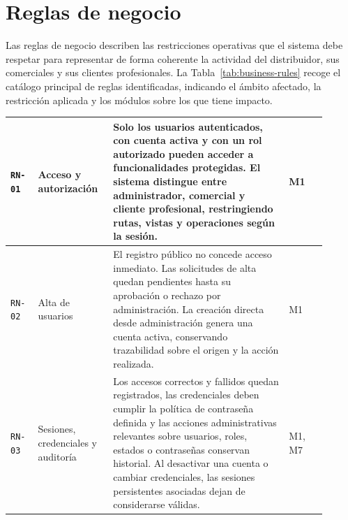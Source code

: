 \section{Reglas de negocio}
\label{sec:BusinessRules}

Las reglas de negocio describen las restricciones operativas que el sistema debe respetar para representar de forma coherente la actividad del distribuidor, sus comerciales y sus clientes profesionales. La Tabla~\ref{tab:business-rules} recoge el catálogo principal de reglas identificadas, indicando el ámbito afectado, la restricción aplicada y los módulos sobre los que tiene impacto.

{\scriptsize
\setlength{\parskip}{0pt}
\setlength{\tabcolsep}{3pt}
\renewcommand{\arraystretch}{1.10}

\begin{supertabular}{|>{\raggedright\arraybackslash}p{0.08\linewidth}|>{\raggedright\arraybackslash}p{0.20\linewidth}|>{\raggedright\arraybackslash}p{0.51\linewidth}|>{\raggedright\arraybackslash}p{0.11\linewidth}|}

\texttt{RN-01} & Acceso y autorización & Solo los usuarios \textbf{autenticados}, con cuenta \textbf{activa} y con un rol autorizado pueden acceder a funcionalidades protegidas. El sistema distingue entre \textbf{administrador}, \textbf{comercial} y \textbf{cliente profesional}, restringiendo rutas, vistas y operaciones según la sesión. & M1 \\
\hline

\texttt{RN-02} & Alta de usuarios & El registro público no concede acceso inmediato. Las solicitudes de alta quedan pendientes hasta su aprobación o rechazo por administración. La creación directa desde administración genera una cuenta activa, conservando trazabilidad sobre el origen y la acción realizada. & M1 \\
\hline

\texttt{RN-03} & Sesiones, credenciales y auditoría & Los accesos correctos y fallidos quedan registrados, las credenciales deben cumplir la política de contraseña definida y las acciones administrativas relevantes sobre usuarios, roles, estados o contraseñas conservan historial. Al desactivar una cuenta o cambiar credenciales, las sesiones persistentes asociadas dejan de considerarse válidas. & M1, M7 \\
\hline


\end{supertabular}}
